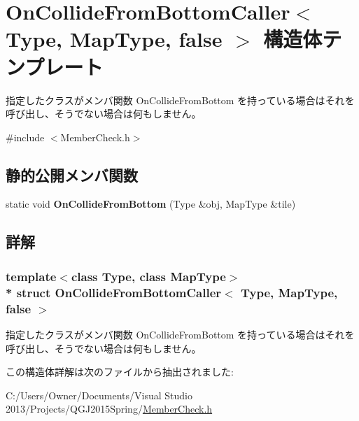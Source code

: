 \hypertarget{struct_on_collide_from_bottom_caller_3_01_type_00_01_map_type_00_01false_01_4}{}\section{On\+Collide\+From\+Bottom\+Caller$<$ Type, Map\+Type, false $>$ 構造体テンプレート}
\label{struct_on_collide_from_bottom_caller_3_01_type_00_01_map_type_00_01false_01_4}


指定したクラスがメンバ関数 On\+Collide\+From\+Bottom を持っている場合はそれを呼び出し、そうでない場合は何もしません。 




{\ttfamily \#include $<$Member\+Check.\+h$>$}

\subsection*{静的公開メンバ関数}
\begin{DoxyCompactItemize}
\item 
static void {\bfseries On\+Collide\+From\+Bottom} (Type \&obj, Map\+Type \&tile)\hypertarget{struct_on_collide_from_bottom_caller_3_01_type_00_01_map_type_00_01false_01_4_a932b030463c345d7cbe056d12b4768e3}{}\label{struct_on_collide_from_bottom_caller_3_01_type_00_01_map_type_00_01false_01_4_a932b030463c345d7cbe056d12b4768e3}

\end{DoxyCompactItemize}


\subsection{詳解}
\subsubsection*{template$<$class Type, class Map\+Type$>$\\*
struct On\+Collide\+From\+Bottom\+Caller$<$ Type, Map\+Type, false $>$}

指定したクラスがメンバ関数 On\+Collide\+From\+Bottom を持っている場合はそれを呼び出し、そうでない場合は何もしません。



この構造体詳解は次のファイルから抽出されました\+:\begin{DoxyCompactItemize}
\item 
C\+:/\+Users/\+Owner/\+Documents/\+Visual Studio 2013/\+Projects/\+Q\+G\+J2015\+Spring/\hyperlink{_member_check_8h}{Member\+Check.\+h}\end{DoxyCompactItemize}

